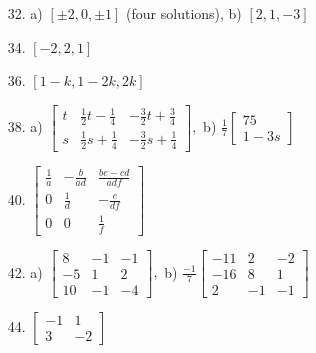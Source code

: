 \documentclass[11pt]{amsbook}
\begin{document}
\begin{enumerate}
    \item[32.] 
        a) $[\pm2,0,\pm1]$ \hspace{5pt} (four solutions),\hspace{10pt} b) $[2,1,-3]$
        
    \item[34.]
        $[-2, 2, 1]$
        
    \item[36.]
        $[1-k, 1-2k, 2k]$
    
    \bigskip
    \item[38.]
        a) 
        $
        \begin{bmatrix}
        t & \frac{1}{2}t - \frac{1}{4} & -\frac{3}{2}t + \frac{3}{4} \\
        s & \frac{1}{2}s + \frac{1}{4} & -\frac{3}{2}s + \frac{1}{4}
        \end{bmatrix}
        ,
        $
        \hspace{9pt}
        b) 
        $
        \frac{1}{7} 
        \begin{bmatrix} 75 \\ 1-3s \end{bmatrix}
        $
    
    \bigskip
    \item[40.]
        $
        \begin{bmatrix}
        \frac{1}{a} & -\frac{b}{ad} & \frac{be-cd}{adf} \\
        0 & \frac{1}{d} & -\frac{e}{df}\\
        0 & 0 & \frac{1}{f}
        \end{bmatrix}
         $
    \bigskip
    \item[42.]
        a)
        $
        \begin{bmatrix}
        8 & -1 & -1 \\
        -5 & 1 & 2 \\
        10 & -1 & -4
        \end{bmatrix}
        ,
        $
        \hspace{9pt}
        b)
        $
        \frac{-1}{7}
        \begin{bmatrix}
        -11 & 2 & -2 \\
        -16 & 8 & 1 \\
        2 & -1 & -1
        \end{bmatrix}
        $
    \bigskip   
    \item[44.] 
        $
        \begin{bmatrix}
        -1 & 1 \\
        3 & -2
        \end{bmatrix}
        $
\end{enumerate}
\end{document}

